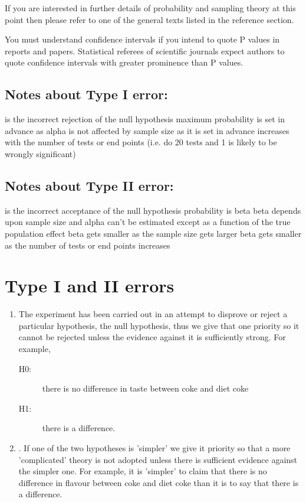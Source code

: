 



If you are interested in further details of probability and sampling theory at this point then please refer to one of the general texts listed in the reference section.

You must understand confidence intervals if you intend to quote P values in reports and papers. Statistical referees of scientific journals expect authors to quote confidence intervals with greater prominence than P values.

\subsection{Notes about Type I error:}
is the incorrect rejection of the null hypothesis
maximum probability is set in advance as alpha
is not affected by sample size as it is set in advance
increases with the number of tests or end points (i.e. do 20 tests and 1 is likely to be wrongly significant)

\subsection{Notes about Type II error:}
is the incorrect acceptance of the null hypothesis
probability is beta
beta depends upon sample size and alpha
can't be estimated except as a function of the true population effect
beta gets smaller as the sample size gets larger
beta gets smaller as the number of tests or end points increases


\section{Type I and II errors}

\begin{enumerate}
\item The experiment has been carried out in an attempt to disprove or reject a particular hypothesis, the null hypothesis, thus we give that one priority so it cannot be rejected unless the evidence against it is sufficiently strong. For example, 

\begin{description}
\item[H0:] there is no difference in taste between coke and diet coke
\item[H1:] there is a difference.
\end{description}
\item. If one of the two hypotheses is 'simpler' we give it priority so that a more 'complicated' theory is not adopted unless there is sufficient evidence against the simpler one. For example, it is 'simpler' to claim that there is no difference in flavour between coke and diet coke than it is to say that there is a difference.
\end{enumerate}

